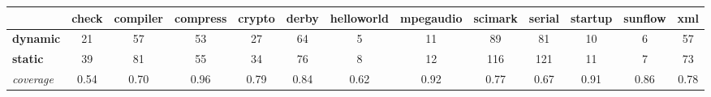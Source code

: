 \documentclass{fac}
\begin{document}
\begin{table} %
\centering
\begin{tabular*}{1.0\textwidth}{|l|c|c|c|c|c|c|c|c|c|c|c|c|}
\hline
 & \hspace{-2pt}check\hspace{-2pt} & \hspace{-2pt}compiler\hspace{-2pt} & \hspace{-2pt}compress\hspace{-2pt} & \hspace{-2pt}crypto\hspace{-2pt} & \hspace{-2pt}derby\hspace{-2pt} & \hspace{-2pt}helloworld\hspace{-2pt} & \hspace{-2pt}mpegaudio\hspace{-2pt} & \hspace{-2pt}scimark\hspace{-2pt} & \hspace{-2pt}serial\hspace{-2pt} & \hspace{-2pt}startup\hspace{-2pt} & \hspace{-2pt}sunflow\hspace{-2pt} & \hspace{-2pt}xml\hspace{-2pt}\\
\hline
\hspace{-3pt}\textbf{dynamic}\hspace{-2pt} & 21 & 57 & 53 & 27 & 64 & 5 & 11 & 89 & 81 & 10 & 6 & 57\\
\hspace{-3pt}\textbf{static} & 39 & 81 & 55 & 34 & 76 & 8 & 12 & 116 & 121 & 11 & 7 & 73\\
\hspace{-3pt}\textit{coverage} & 0.54 & 0.70 & 0.96 & 0.79 & 0.84 & 0.62 & 0.92 & 0.77 & 0.67 & 0.91 & 0.86 & 0.78\\

\end{tabular*}
\end{table}
\end{document}
